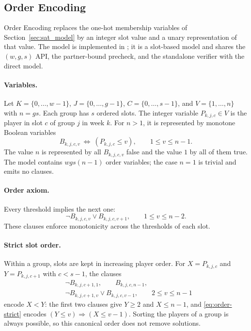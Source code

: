 \documentclass[a4paper,fleqn]{cas-sc}
\begin{document}
\subsection{Order Encoding}
\label{sec:order_encoding}

Order Encoding \cite{tamura2009order} replaces the one-hot membership
variables of Section~\ref{sec:sat_model} by an integer slot value and a
unary representation of that value. The model is implemented in
; it is a slot-based model and shares the
$(w,g,s)$ API, the partner-bound precheck, and the standalone verifier
with the direct model.

\paragraph{Variables.}
Let $K=\{0,\ldots,w-1\}$, $J=\{0,\ldots,g-1\}$,
$C=\{0,\ldots,s-1\}$, and $V=\{1,\ldots,n\}$ with $n=gs$. Each group has
$s$ ordered slots. The integer variable $P_{k,j,c}\in V$ is the player
in slot $c$ of group $j$ in week $k$. For $n>1$, it is represented by
monotone Boolean variables
\begin{equation}
 B_{k,j,c,v}\ \Longleftrightarrow\ (P_{k,j,c}\le v),
 \qquad 1\le v\le n-1.
 \label{eq:order-meaning}
\end{equation}
The value $n$ is represented by all $B_{k,j,c,v}$ false and the value
$1$ by all of them true. The model contains $wgs(n-1)$ order variables;
the case $n=1$ is trivial and emits no clauses.

\paragraph{Order axiom.}
Every threshold implies the next one:
\begin{equation}
 \neg B_{k,j,c,v}\lor B_{k,j,c,v+1},
 \qquad 1\le v\le n-2.
 \label{eq:order-chain}
\end{equation}
These clauses enforce monotonicity across the thresholds of each slot.

\paragraph{Strict slot order.}
Within a group, slots are kept in increasing player order. For
$X=P_{k,j,c}$ and $Y=P_{k,j,c+1}$ with $c<s-1$, the clauses
\begin{align}
 &\neg B_{k,j,c+1,1},\qquad B_{k,j,c,n-1}, \label{eq:order-strict-bounds}\\
 &\neg B_{k,j,c+1,v}\lor B_{k,j,c,v-1},
 \qquad 2\le v\le n-1 \label{eq:order-strict}
\end{align}
encode $X<Y$: the first two clauses give $Y\ge 2$ and $X\le n-1$, and
\eqref{eq:order-strict} encodes
$(Y\le v)\Rightarrow(X\le v-1)$. Sorting the players of a group is
always possible, so this canonical order does not remove solutions.
\end{document}
